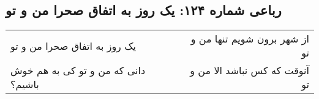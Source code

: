 \begin{center}
\section*{رباعی شماره ۱۲۴: یک روز به اتفاق صحرا من و تو}
\label{sec:124}
\begin{longtable}{l p{0.5cm} r}
یک روز به اتفاق صحرا من و تو
&&
از شهر برون شویم تنها من و تو
\\
دانی که من و تو کی به هم خوش باشیم؟
&&
آنوقت که کس نباشد الا من و تو
\\
\end{longtable}
\end{center}
